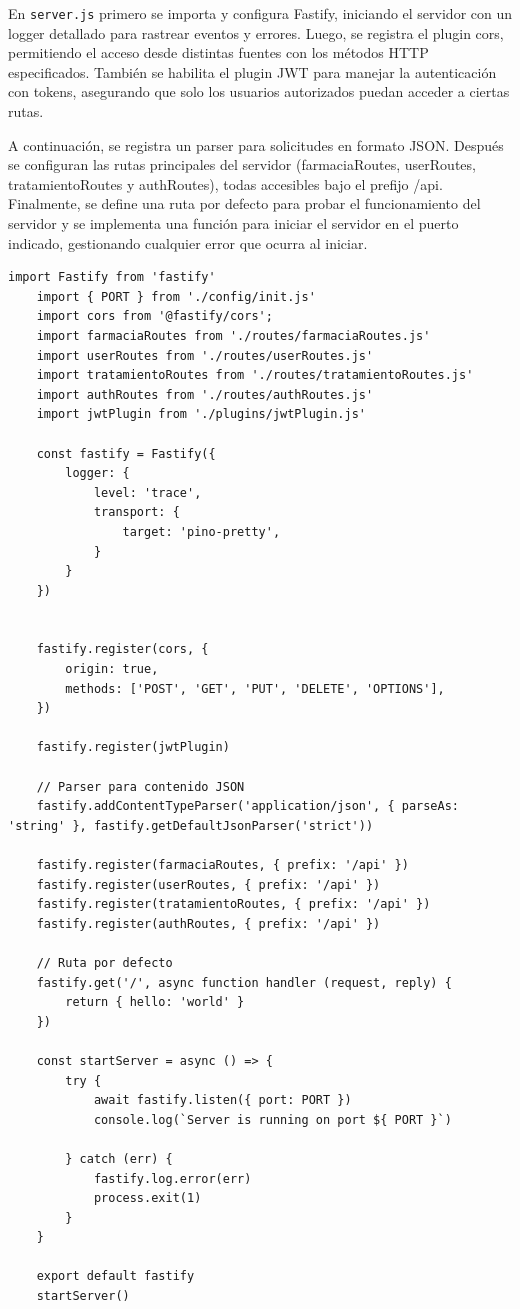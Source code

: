 \begin{itemize}
En \texttt{server.js} primero se importa y configura Fastify, iniciando el servidor con un logger detallado para rastrear eventos y errores. Luego, se registra el plugin cors, permitiendo el acceso desde distintas fuentes con los métodos HTTP especificados. También se habilita el plugin JWT para manejar la autenticación con tokens, asegurando que solo los usuarios autorizados puedan acceder a ciertas rutas.

A continuación, se registra un parser para solicitudes en formato JSON. Después se configuran las rutas principales del servidor (farmaciaRoutes, userRoutes, tratamientoRoutes y authRoutes), todas accesibles bajo el prefijo /api. Finalmente, se define una ruta por defecto para probar el funcionamiento del servidor y se implementa una función para iniciar el servidor en el puerto indicado, gestionando cualquier error que ocurra al iniciar.

\begin{lstlisting}[caption={Archivo server.js - Configuración del servidor Fastify}, label={lst:server-js}]
	import Fastify from 'fastify'
	import { PORT } from './config/init.js'
	import cors from '@fastify/cors'; 
	import farmaciaRoutes from './routes/farmaciaRoutes.js'
	import userRoutes from './routes/userRoutes.js'
	import tratamientoRoutes from './routes/tratamientoRoutes.js'
	import authRoutes from './routes/authRoutes.js'
	import jwtPlugin from './plugins/jwtPlugin.js'
	
	const fastify = Fastify({
		logger: {
			level: 'trace',
			transport: {
				target: 'pino-pretty',
			}
		}
	})
	

	fastify.register(cors, { 
		origin: true, 
		methods: ['POST', 'GET', 'PUT', 'DELETE', 'OPTIONS'],
	})
	
	fastify.register(jwtPlugin)
	
	// Parser para contenido JSON
	fastify.addContentTypeParser('application/json', { parseAs: 'string' }, fastify.getDefaultJsonParser('strict'))
	
	fastify.register(farmaciaRoutes, { prefix: '/api' })
	fastify.register(userRoutes, { prefix: '/api' })
	fastify.register(tratamientoRoutes, { prefix: '/api' })
	fastify.register(authRoutes, { prefix: '/api' })
	
	// Ruta por defecto
	fastify.get('/', async function handler (request, reply) {
		return { hello: 'world' }
	})
	
	const startServer = async () => {
		try {
			await fastify.listen({ port: PORT })
			console.log(`Server is running on port ${ PORT }`)
			
		} catch (err) {
			fastify.log.error(err)
			process.exit(1)
		}
	}
	
	export default fastify
	startServer()
\end{lstlisting}


\end{itemize}

